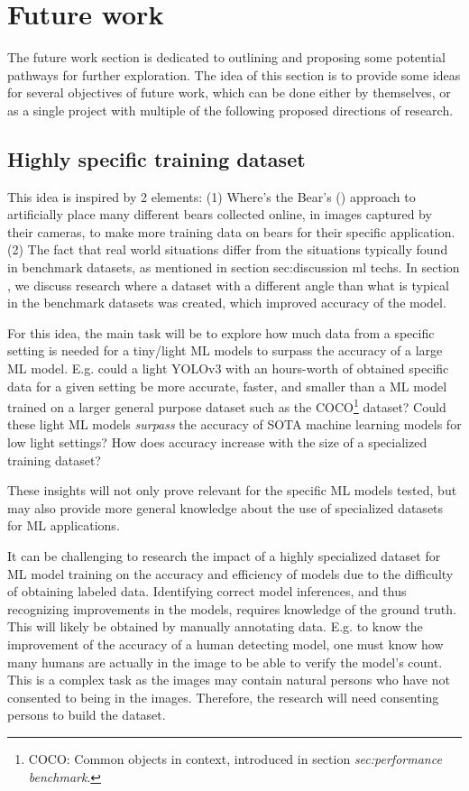 \section{Future work}
\label{sec:proposed_future_work}
The future work section is dedicated to outlining and proposing some potential pathways for further exploration. The idea of this section is to provide some ideas for several objectives of future work, which can be done either by themselves, or as a single project with multiple of the following proposed directions of research.

\subsection{Highly specific training dataset}
    This idea is inspired by 2 elements: (1) Where's the Bear's (\cite{el2017WTB}) approach to artificially place many different bears collected online, in images captured by their cameras, to make more training data on bears for their specific application. (2) The fact that real world situations differ from the situations typically found in benchmark datasets, as mentioned in section sec:discussion ml techs. In section , we discuss research where a dataset with a different angle than what is typical in the benchmark datasets was created, which improved accuracy of the model.

    For this idea, the main task will be to explore how much data from a specific setting is needed for a tiny/light ML models to surpass the accuracy of a large ML model. E.g. could a light YOLOv3 with an hours-worth of obtained specific data for a given setting be more accurate, faster, and smaller than a ML model trained on a larger general purpose dataset such as the COCO\footnote{COCO: Common objects in context, introduced in section \textit{sec:performance benchmark}.} dataset? Could these light ML models \textit{surpass} the accuracy of SOTA machine learning models for low light settings? How does accuracy increase with the size of a specialized training dataset?
    
    These insights will not only prove relevant for the specific ML models tested, but may also provide more general knowledge about the use of specialized datasets for ML applications. 
    
    It can be challenging to research the impact of a highly specialized dataset for ML model training on the accuracy and efficiency of models due to the difficulty of obtaining labeled data. Identifying correct model inferences, and thus recognizing improvements in the models, requires knowledge of the ground truth. This will likely be obtained by manually annotating data. E.g. to know the improvement of the accuracy of a human detecting model, one must know how many humans are actually in the image to be able to verify the model's count. This is a complex task as the images may contain natural persons who have not consented to being in the images. Therefore, the research will need consenting persons to build the dataset.
    

